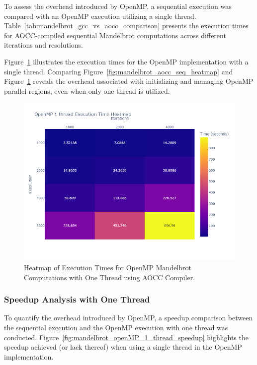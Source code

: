 \documentclass[
	report, %
	11pt, %
]{CSUniSchoolLabReport}
\newcounter{ct}
\begin{document}
To assess the overhead introduced by OpenMP, a sequential execution was compared with an OpenMP execution utilizing a single thread. Table~\ref{tab:mandelbrot_gcc_vs_aocc_comparison} presents the execution times for AOCC-compiled sequential Mandelbrot computations across different iterations and resolutions.

Figure~\ref{fig:mandelbrot_openMP_1_thread_heatmap} illustrates the execution times for the OpenMP implementation with a single thread. Comparing Figure~\ref{fig:mandelbrot_aocc_seq_heatmap} and Figure~\ref{fig:mandelbrot_openMP_1_thread_heatmap} reveals the overhead associated with initializing and managing OpenMP parallel regions, even when only one thread is utilized.

\begin{figure}[H]
	\captionsetup{justification=centering, width=.8\linewidth}
	\centering
	\includegraphics[width=\textwidth]{./img/mandelbrot_openmp_1_thread_heatmap.png}
	\caption{Heatmap of Execution Times for OpenMP Mandelbrot Computations with One Thread using AOCC Compiler.}
	\label{fig:mandelbrot_openMP_1_thread_heatmap}
\end{figure}

\subsubsection{Speedup Analysis with One Thread}

To quantify the overhead introduced by OpenMP, a speedup comparison between the sequential execution and the OpenMP execution with one thread was conducted. Figure~\ref{fig:mandelbrot_openMP_1_thread_speedup} highlights the speedup achieved (or lack thereof) when using a single thread in the OpenMP implementation.
\end{document}
